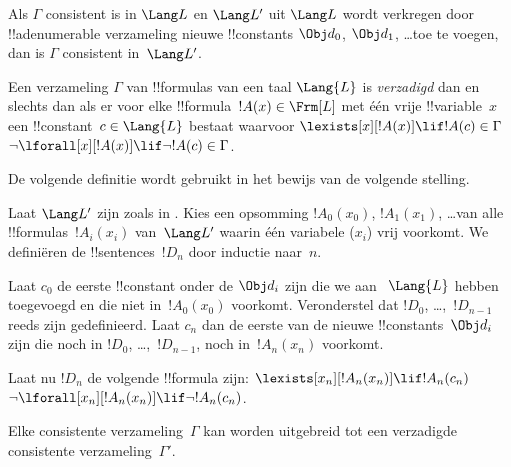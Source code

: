 \documentclass[openany]{memoir}
\begin{document}
\begin{prop}
Als $\Gamma$ consistent is in $\Lang L$ en $\Lang L'$ uit $\Lang L$
wordt verkregen door !!a{denumerable} verzameling nieuwe
!!{constant}s $\Obj d_0$, $\Obj d_1$, \dots toe te voegen, dan is
$\Gamma$ consistent in~$\Lang L'$.
\end{prop}

\begin{defn}
Een verzameling $\Gamma$ van !!{formula}s van een taal $\Lang {L}$ is
\emph{verzadigd} dan en slechts dan als er voor elke
!!{formula}~$!A(x) \in \Frm[L]$ met één vrije !!{variable}~$x$ een
!!{constant}~$c \in \Lang{L}$ bestaat waarvoor
      {$\lexists[x][!A(x)] \lif !A(c) \in \Gamma$}
      {$\lnot\lforall[x][!A(x)] \lif \lnot !A(c) \in \Gamma$}.
\end{defn}

De volgende definitie wordt gebruikt in het bewijs van de volgende
stelling.

\begin{defn}
Laat $\Lang L'$ zijn zoals in . Kies een opsomming
$!A_0(x_0)$, $!A_1(x_1)$, \dots van alle !!{formula}s~$!A_i(x_i)$
van~$\Lang L'$ waarin één variabele ($x_i$) vrij voorkomt. We definiëren
de !!{sentence}s~$!D_n$ door inductie naar~$n$.

Laat $c_0$ de eerste !!{constant} onder de $\Obj d_i$ zijn die we aan
~$\Lang{L}$ hebben toegevoegd en die niet in~$!A_0(x_0)$ voorkomt.
Veronderstel dat $!D_0$, \dots,~$!D_{n-1}$ reeds zijn gedefinieerd. Laat
$c_n$ dan de eerste van de nieuwe !!{constant}s~$\Obj d_i$ zijn die noch
in $!D_0$, \dots,~$!D_{n-1}$, noch in~$!A_n(x_n)$ voorkomt.

Laat nu $!D_{n}$ de volgende !!{formula} zijn: 
{$\lexists[x_{n}][!A_{n}(x_{n})] \lif
  !A_{n}(c_{n})$}{$\lnot\lforall[x_{n}][!A_{n}(x_{n})] \lif \lnot
  !A_{n}(c_{n})$}.
\end{defn}

\begin{lem}
Elke consistente verzameling~$\Gamma$ kan worden uitgebreid tot een
verzadigde consistente verzameling~$\Gamma'$.
\end{lem}
\end{document}
